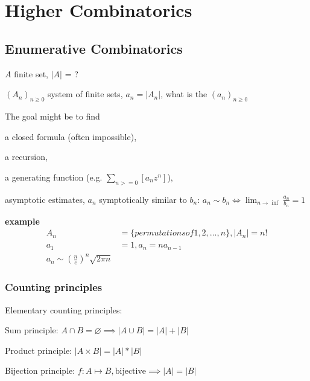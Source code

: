 

\chapter{Higher Combinatorics}

\section{Enumerative Combinatorics}

\strut{}
$A$ finite set, $|A|$ = ?

$(A_n)_{n ≥ 0}$ system of finite sets, $a_n = |A_n|$, what is the  $(a_n)_{n ≥ 0}$

The goal might be to find
\begin{compactitem}
\item a closed formula (often impossible),
\item a recursion,
\item a generating function (e.g. $\sum_{n >= 0}[a_n z^n]$),
\item asymptotic estimates, $a_n$ symptotically similar to $b_n$:
    $a_n \sim b_n \iff \lim_{n \to \inf} \frac{a_n}{b_n} = 1$
\end{compactitem}


\textbf{example}
\begin{align*}
A_n &= \{permutations of 1,2, \ldots, n\}, |A_n| = n! \\
a_1 &= 1, a_n = n a_{n-1} \\
a_n \sim (\frac{n}{e})^n \sqrt{2\pi n}
\end{align*}


\subsection{Counting principles}

Elementary counting principles:
\begin{compactenum}
\item Sum principle:
    $A\cap B = \varnothing \implies |A\cup B| = |A| + |B|$
\item Product principle:
    $|A\times B| = |A| * |B|$
\item Bijection principle:
    $f: A\mapsto B, \text{bijective}\implies |A| = |B|$
\end{compactenum}

